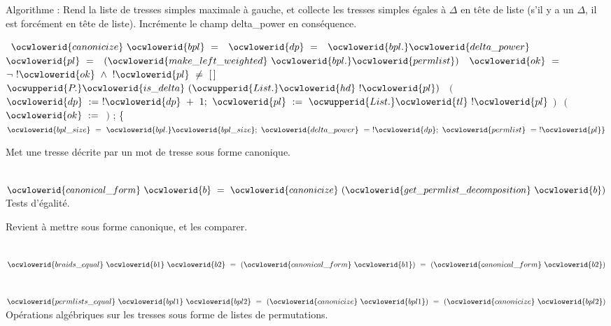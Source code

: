 \documentclass[12pt]{article}
\begin{document}
   Algorithme : Rend la liste de tresses simples maximale à gauche, et collecte
   les tresses simples égales à $\Delta$ en tête de liste (s'il y a un $\Delta$, il
   est forcément en tête de liste). Incrémente le champ delta\_power en conséquence.

\ocweol
\label{Canonical.ml:4720}%
\medskip
\ocwbegincode{}\ocwindent{0.00em}
~$\ocwlowerid{canonicize}~\ocwlowerid{bpl}~=$\ocweol
\ocwindent{1.00em}
~$\ocwlowerid{dp}~=~$~$\ocwlowerid{bpl.}\ocwlowerid{delta\_power}~$\ocweol
\ocwindent{1.00em}
~$\ocwlowerid{pl}~=~$~$(\ocwlowerid{make\_left\_weighted}~\ocwlowerid{bpl.}\ocwlowerid{permlist})$\ocweol
\ocwindent{1.00em}
~$\ocwlowerid{ok}~=~$~~\ocweol
\ocwindent{1.00em}
~$\lnot{}~!\ocwlowerid{ok}~\land{}~!\ocwlowerid{pl}~\not=~[\,]~$\ocweol
\ocwindent{2.00em}
~$\ocwupperid{P.}\ocwlowerid{is\_delta}~(\ocwupperid{List.}\ocwlowerid{hd}~!\ocwlowerid{pl})~$~$($\ocweol
\ocwindent{3.00em}
$\ocwlowerid{dp}~:=~!\ocwlowerid{dp}~+~1;$\ocweol
\ocwindent{3.00em}
$\ocwlowerid{pl}~:=~\ocwupperid{List.}\ocwlowerid{tl}~!\ocwlowerid{pl}$\ocweol
\ocwindent{2.00em}
$)~$~$($\ocweol
\ocwindent{3.00em}
$\ocwlowerid{ok}~:=~$\ocweol
\ocwindent{2.00em}
$)$\ocweol
\ocwindent{1.00em}
;\ocweol
\ocwindent{1.00em}
\{$\ocwlowerid{bpl\_size}~=~\ocwlowerid{bpl.}\ocwlowerid{bpl\_size};~\ocwlowerid{delta\_power}~=~!\ocwlowerid{dp};~\ocwlowerid{permlist}~=~!\ocwlowerid{pl}\}$\medskip

\ocwendcode{}\ocwindent{0.00em}
Met une tresse décrite par un mot de tresse sous forme canonique.

\ocweol
\label{Canonical.ml:5147}%
\medskip
\ocwbegincode{}\ocwindent{0.00em}
~$\ocwlowerid{canonical\_form}~\ocwlowerid{b}~=~\ocwlowerid{canonicize}~(\ocwlowerid{get\_permlist\_decomposition}~\ocwlowerid{b})$\ocweol
\ocwendcode{}\allowbreak\ocwsection
\label{Canonical.ml:5218}%
Tests d'égalité.

   Revient à mettre sous forme canonique, et les comparer.

\ocweol
\label{Canonical.ml:5304}%
\medskip
\ocwbegincode{}\ocwindent{0.00em}
~$\ocwlowerid{braids\_equal}~\ocwlowerid{b1}~\ocwlowerid{b2}~=~(\ocwlowerid{canonical\_form}~\ocwlowerid{b1})~=~(\ocwlowerid{canonical\_form}~\ocwlowerid{b2})$\medskip

\label{Canonical.ml:5373}%
\ocwindent{0.00em}
~$\ocwlowerid{permlists\_equal}~\ocwlowerid{bpl1}~\ocwlowerid{bpl2}~=~(\ocwlowerid{canonicize}~\ocwlowerid{bpl1})~=~(\ocwlowerid{canonicize}~\ocwlowerid{bpl2})$\ocweol
\ocwendcode{}\allowbreak\ocwsection
\label{Canonical.ml:5448}%
Opérations algébriques sur les tresses sous forme de listes de permutations.
\end{document}
